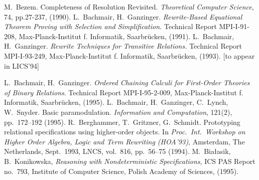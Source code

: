 \begin{thebibliography}{MM99}\MyLPar
{} M.~Bezem. 
   Completeness of Resolution Revisited. 
   {\em Theoretical Computer Science}, 74, pp.27-237, (1990).
 L.~Bachmair, H.~Ganzinger. 
   {\em Rewrite-Based Equational Theorem Proving with 
                           Selection and Simplification.}
   Technical Report MPI-I-91-208, Max-Planck-Institut f. Informatik, 
   Saarbr\"ucken, (1991).
 L.~Bachmair, H.~Ganzinger. 
   {\em Rewrite Techniques for Transitive Relations.}
   Technical Report MPI-I-93-249, Max-Planck-Institut f. Informatik, 
   Saarbr\"ucken, (1993). [to appear in LICS'94]

 L.~Bachmair, H.~Ganzinger. 
   {\it Ordered Chaining Calculi for First-Order Theories of Binary Relations}.
   Technical Report MPI-I-95-2-009, Max-Planck-Institut f. Informatik, 
   Saarbr\"ucken, (1995).
 L.~Bachmair, H.~Ganzinger, C.~Lynch,  W.~Snyder. 
   Basic paramodulation. {\it Information and Computation}, 121(2),
   pp.~172--192 (1995). 
 R.~Berghammer, T.~Gritzner, G.~Schmidt. Prototyping
   relational specifications using higher-order objects. In {\it
   Proc.\ Int.\ Workshop on Higher Order Algebra, Logic and Term Rewriting
   (HOA'93)}, Amsterdam, The Netherlands, Sept.\ 1993, LNCS, vol.~816,
   pp.~56--75 (1994).
 M.~Bia{\l}asik, B.~Konikowska, {\it Reasoning with 
   Nondeterministic Specifications}, ICS PAS Report no.~793, Institute
  of Computer Science, Polish Academy of Sciences, (1995).


\end{thebibliography}
